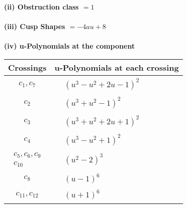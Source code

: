 \documentclass[1p]{elsarticle_modified}
\theoremstyle{definition}
\begin{document}
\flushleft \textbf{(ii) Obstruction class $= 1$}\\~\\
\flushleft \textbf{(iii) Cusp Shapes $= -4 a u+8$}\\~\\
\newpage\renewcommand{\arraystretch}{1}
\flushleft \textbf{(iv) u-Polynomials at the component}\newline \\
\begin{tabular}{m{50pt}|m{274pt}}
Crossings & \hspace{64pt}u-Polynomials at each crossing \\
\hline $$\begin{aligned}c_{1},c_{7}\end{aligned}$$&$\begin{aligned}
&(u^3- u^2+2 u-1)^2
\end{aligned}$\\
\hline $$\begin{aligned}c_{2}\end{aligned}$$&$\begin{aligned}
&(u^3+u^2-1)^2
\end{aligned}$\\
\hline $$\begin{aligned}c_{3}\end{aligned}$$&$\begin{aligned}
&(u^3+u^2+2 u+1)^2
\end{aligned}$\\
\hline $$\begin{aligned}c_{4}\end{aligned}$$&$\begin{aligned}
&(u^3- u^2+1)^2
\end{aligned}$\\
\hline $$\begin{aligned}c_{5},c_{6},c_{9}\\c_{10}\end{aligned}$$&$\begin{aligned}
&(u^2-2)^3
\end{aligned}$\\
\hline $$\begin{aligned}c_{8}\end{aligned}$$&$\begin{aligned}
&(u-1)^6
\end{aligned}$\\
\hline $$\begin{aligned}c_{11},c_{12}\end{aligned}$$&$\begin{aligned}
&(u+1)^6
\end{aligned}$\\
\hline
\end{tabular}\\~\\
\end{document}
